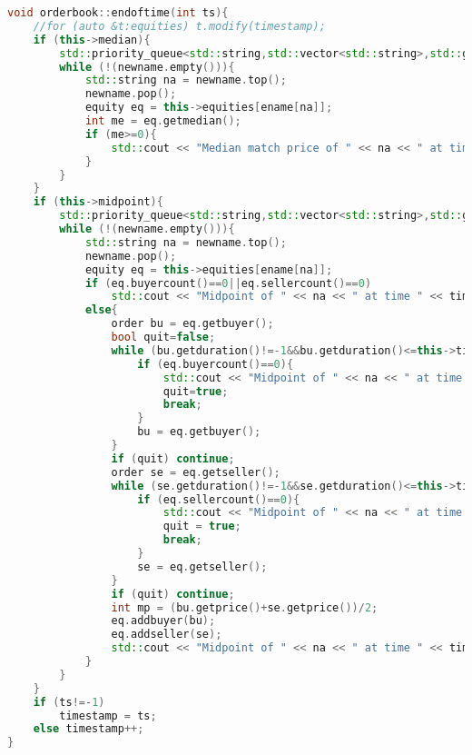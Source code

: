 \documentclass{article}
\begin{document}
\begin{lstlisting}[title=orderbook.cpp,language=C++]
void orderbook::endoftime(int ts){
    //for (auto &t:equities) t.modify(timestamp);
    if (this->median){
        std::priority_queue<std::string,std::vector<std::string>,std::greater<std::string> > newname(this->ordered_ename);
        while (!(newname.empty())){
            std::string na = newname.top();
            newname.pop();
            equity eq = this->equities[ename[na]];
            int me = eq.getmedian();
            if (me>=0){
                std::cout << "Median match price of " << na << " at time " << timestamp << " is $" << me << std::endl; 
            }
        }
    }
    if (this->midpoint){
        std::priority_queue<std::string,std::vector<std::string>,std::greater<std::string> > newname(this->ordered_ename);
        while (!(newname.empty())){
            std::string na = newname.top();
            newname.pop();
            equity eq = this->equities[ename[na]];
            if (eq.buyercount()==0||eq.sellercount()==0)
                std::cout << "Midpoint of " << na << " at time " << timestamp << " is undefined" << std::endl;
            else{
                order bu = eq.getbuyer();
                bool quit=false;
                while (bu.getduration()!=-1&&bu.getduration()<=this->timestamp){
                    if (eq.buyercount()==0){
                        std::cout << "Midpoint of " << na << " at time " << timestamp << " is undefined" << std::endl;
                        quit=true;
                        break;
                    }
                    bu = eq.getbuyer();
                }
                if (quit) continue;
                order se = eq.getseller();
                while (se.getduration()!=-1&&se.getduration()<=this->timestamp){
                    if (eq.sellercount()==0){
                        std::cout << "Midpoint of " << na << " at time " << timestamp << " is undefined" << std::endl;
                        quit = true;
                        break;
                    }
                    se = eq.getseller();
                }
                if (quit) continue;
                int mp = (bu.getprice()+se.getprice())/2;
                eq.addbuyer(bu);
                eq.addseller(se);
                std::cout << "Midpoint of " << na << " at time " << timestamp << " is $" << mp << std::endl;
            }
        }
    }
    if (ts!=-1)
        timestamp = ts;
    else timestamp++;
}
    \end{lstlisting}
\end{document}

